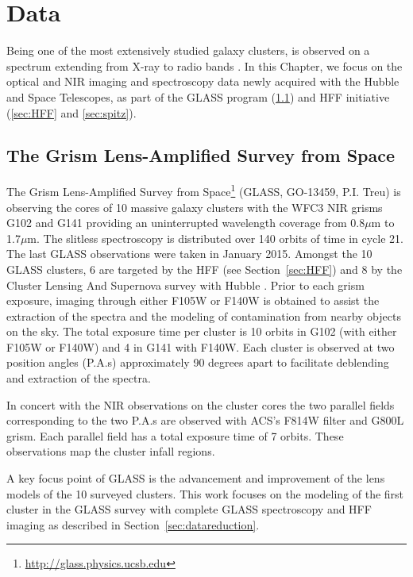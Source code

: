 \section{Data}
\label{sec:data}

Being one of the most extensively studied galaxy clusters, \cler is observed on a spectrum extending
from X-ray to radio bands \citep[e.g.][]{2004MNRAS.349..385K}. In this Chapter, we focus on the optical and NIR
imaging and spectroscopy data newly acquired with the Hubble and
\spitzer Space Telescopes, as part of the GLASS program (\ref{sec:glass}) and
HFF initiative (\ref{sec:HFF} and \ref{sec:spitz}).

\subsection{The Grism Lens-Amplified Survey from Space}
\label{sec:glass}

The Grism Lens-Amplified Survey from Space\footnote{\url{http://glass.physics.ucsb.edu}} (GLASS, GO-13459, P.I.
Treu) is observing the cores of 10 massive galaxy clusters with the \hst WFC3 NIR grisms G102 and G141 providing
an uninterrupted wavelength coverage from 0.8$\mu$m to 1.7$\mu$m.  The slitless spectroscopy is distributed over
140 orbits of \hst time in cycle 21. The last GLASS observations were taken in January 2015.  Amongst the 10
GLASS clusters, 6 are targeted by the HFF (see Section~\ref{sec:HFF}) and 8 by the Cluster Lensing And Supernova
survey with Hubble \citep[CLASH; P.I. Postman,][]{Postman:2012p27556}. Prior to each grism exposure, imaging
through either F105W or F140W is obtained to assist the extraction of the spectra and the modeling of
contamination from nearby objects on the sky.  The total exposure time per cluster is 10 orbits in G102 (with
either F105W or F140W) and 4 in G141 with F140W. Each cluster is observed at two position angles (P.A.s)
approximately 90 degrees apart to facilitate deblending and extraction of the spectra.

In concert with the NIR observations on the cluster cores
the two parallel fields corresponding to the two P.A.s are observed
with ACS's F814W filter and G800L grism.  Each parallel field has a
total exposure time of 7 orbits.  These observations map the cluster
infall regions.

A key focus point of GLASS is the advancement and improvement of the
lens models of the 10 surveyed clusters.  This work focuses on the
modeling of the first cluster in the GLASS survey with complete GLASS
spectroscopy and HFF imaging as described in
Section~\ref{sec:datareduction}.

